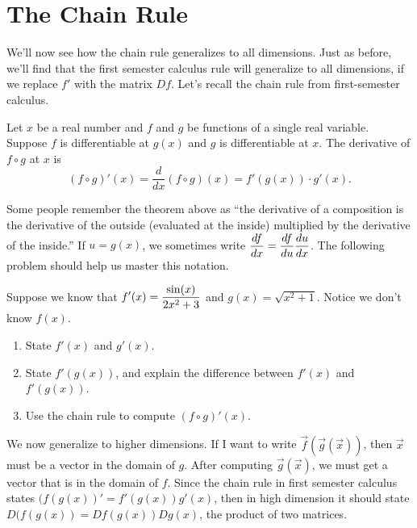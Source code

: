 \section{The Chain Rule}

We'll now see how the chain rule generalizes to all dimensions.  Just as before, we'll find that the first semester calculus rule will generalize to all dimensions, if we replace $f'$ with the matrix $Df$. 
Let's recall the chain rule from first-semester calculus. 

\begin{theorem}
 Let $x$ be a real number and $f$ and $g$ be functions of a single real variable. Suppose $f$ is differentiable at $g(x)$ and $g$ is differentiable at $x$. The derivative of $f\circ g$ at $x$ is 
$$(f\circ g)'(x) = \frac{d}{dx}(f\circ g)(x) = f'(g(x))\cdot g'(x).$$
\end{theorem}

Some people remember the theorem above as ``the derivative of a composition is the derivative of the outside (evaluated at the inside) multiplied by the derivative of the inside.'' If $u=g(x)$, we sometimes write $\displaystyle \frac{df}{dx}=\frac{df}{du}\frac{du}{dx}$. The following problem should help us master this notation.

\begin{problem}\label{chain rule review problem}
 Suppose we know that $\displaystyle f'(x) = \frac{\sin(x)}{2x^2+3}$ and $g(x)=\sqrt{x^2+1}$. Notice we don't know $f(x)$. 
\begin{enumerate}
 \item State $f'(x)$ and $g'(x)$.
 \item State $f'(g(x))$, and explain the difference between $f'(x)$ and $f'(g(x))$. 
 \item Use the chain rule to compute $(f\circ g)'(x)$. 
\end{enumerate}
\end{problem}

We now generalize to higher dimensions. If I want to write $\vec f(\vec g(\vec x))$, then $\vec x$ must be a vector in the domain of $g$.  After computing $\vec g(\vec x)$, we must get a vector that is in the domain of $f$.  Since the chain rule in first semester calculus states $(f(g(x))'=f'(g(x))g'(x)$, then in high dimension it should state $D(f(g(x)) = Df(g(x))Dg(x)$, the product of two matrices. 

